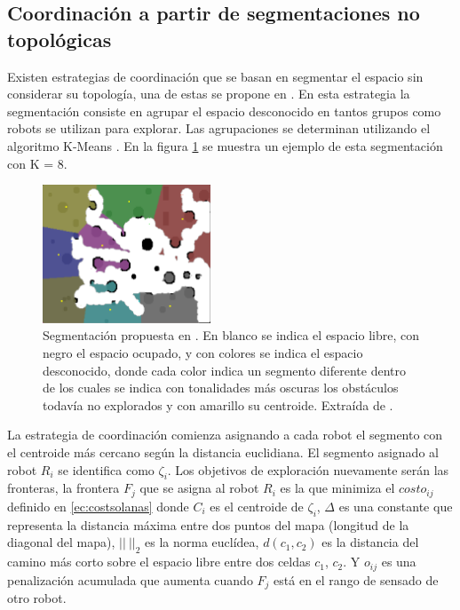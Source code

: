 \subsection{Coordinación a partir de segmentaciones no topológicas}\label{subsec:coordNoTop}
Existen estrategias de coordinación que se basan en segmentar el espacio sin considerar su topología, una de estas se propone en \cite{Solanas2004}. En esta estrategia la segmentación consiste en agrupar el espacio desconocido en tantos grupos como robots se utilizan para explorar. Las agrupaciones se determinan utilizando el algoritmo K-Means \cite{hartigan1979ak}. En la figura \ref{fig:ejemploCoodGrill} se muestra un ejemplo de esta segmentación con K = 8.  %
\begin{figure}[H]
  \center
  \includegraphics[width=5.0cm]{imagenes/coordGrillCM.png}
  \caption[Segmentación propuesta en \cite{Solanas2004}.]{Segmentación propuesta en \cite{Solanas2004}. En blanco se indica el espacio libre, con negro el espacio ocupado, y con colores se indica el espacio desconocido, donde cada color indica un segmento diferente dentro de los cuales se indica con tonalidades más oscuras los obstáculos todavía no explorados y con amarillo su centroide. Extraída de \cite{wu2007voronoi}.}\label{fig:ejemploCoodGrill}
\end{figure} 

La estrategia de coordinación comienza asignando a cada robot el segmento con el centroide más cercano según la distancia euclidiana. El segmento asignado al robot $R_i$ se identifica como $\zeta_i$.
Los objetivos de exploración nuevamente serán las fronteras, la frontera $F_j$ que se asigna al robot $R_i$ es la que minimiza el $costo_{ij}$ definido en \eqref{ec:costsolanas} donde $C_i$ es el centroide de $\zeta_i$, $\Delta$ es una constante que representa la distancia máxima entre dos puntos del mapa (longitud de la diagonal del mapa), $||\ ||_2$ es la norma euclídea, $d(c_1,c_2)$ es la distancia del camino más corto sobre el espacio libre entre dos celdas $c_1$, $c_2$. Y $o_{ij}$ es una penalización acumulada que aumenta cuando $F_j$ está en el rango de sensado de otro robot.

